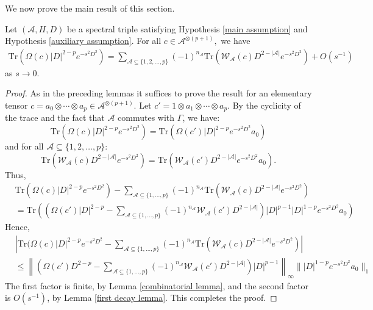     We now prove the main result of this section.
    \begin{thm}\label{combinatorial theorem} 
        Let $(\mathcal{A},H,D)$ be a spectral triple satisfying Hypothesis \ref{main assumption} and Hypothesis \ref{auxiliary assumption}. 
        For all $c\in\mathcal{A}^{\otimes (p+1)},$ we have
        \begin{align*}
            \mathrm{Tr}(\Omega(c)|D|^{2-p}e^{-s^2D^2}) = \sum_{\mathscr{A} \subseteq \{1,2,\ldots,p\}} (-1)^{n_{\mathscr{A}}}\mathrm{Tr}(\mathcal{W}_{\mathscr{A}}(c)D^{2-|\mathscr{A}|}e^{-s^2D^2})+O(s^{-1})
        \end{align*}
        as $s\to 0$.
    \end{thm}
    \begin{proof}
        As in the preceding lemmas it suffices to prove the result for an elementary tensor $c = a_0\otimes\cdots \otimes a_p \in \mathcal{A}^{\otimes(p+1)}$. Let $c' = 1\otimes a_1\otimes\cdots\otimes a_p$. 
        By the cyclicity of the trace and the fact that $\mathcal{A}$ commutes with $\Gamma$, we have:
        \begin{equation*}
            \mathrm{Tr}(\Omega(c)|D|^{2-p}e^{-s^2D^2}) = \mathrm{Tr}(\Omega(c')|D|^{2-p}e^{-s^2D^2}a_0)
        \end{equation*}
        and for all $\mathscr{A} \subseteq \{1,2,\ldots,p\}$:
        \begin{equation*}
            \mathrm{Tr}(\mathcal{W}_{\mathscr{A}}(c)D^{2-|\mathscr{A}|}e^{-s^2D^2}) = \mathrm{Tr}(\mathcal{W}_{\mathscr{A}}(c')D^{2-|\mathscr{A}|}e^{-s^2D^2}a_0).
        \end{equation*}
        Thus,
        \begin{align*}
            &\mathrm{Tr}(\Omega(c)|D|^{2-p}e^{-s^2D^2})-\sum_{\mathscr{A}\subseteq \{1,\ldots,p\}}(-1)^{n_{\mathscr{A}}}\mathrm{Tr}(\mathcal{W}_{\mathscr{A}}(c)D^{2-|\mathscr{A}|}e^{-s^2D^2})\\
                                                    &=\mathrm{Tr}\left(\left(\Omega(c')|D|^{2-p}-\sum_{\mathscr{A}\subseteq \{1,\ldots,p\}}(-1)^{n_{\mathscr{A}}}\mathcal{W}_{\mathscr{A}}(c')D^{2-|\mathscr{A}|}\right)|D|^{p-1}|D|^{1-p}e^{-s^2D^2}a_0\right)
        \end{align*}
            Hence,
        \begin{align*}
            &\left|\mathrm{Tr}(\Omega(c)|D|^{2-p}e^{-s^2D^2}-\sum_{\mathscr{A}\subseteq \{1,\ldots,p\}}(-1)^{n_{\mathscr{A}}}\mathrm{Tr}(\mathcal{W}_{\mathscr{A}}(c)D^{2-|\mathscr{A}|}e^{-s^2D^2})\right|\\
            &\leq \left\|\left(\Omega(c')D^{2-p}-\sum_{\mathscr{A}\subseteq \{1,\ldots,p\}}(-1)^{n_{\mathscr{A}}}\mathcal{W}_{\mathscr{A}}(c')D^{2-|\mathscr{A}|}\right)|D|^{p-1}\right\|_\infty\||D|^{1-p}e^{-s^2D^2}a_0\|_1
        \end{align*}
        The first factor is finite, by Lemma \ref{combinatorial lemma}, and the second factor is $O(s^{-1})$, by Lemma \ref{first decay lemma}.
        This completes the proof.
    \end{proof}


